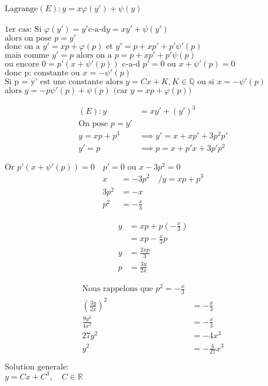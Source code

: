 $\text{Lagrange} (E): y = x \varphi(y') +\psi(y)$ \\ \\
$\text{1er cas: Si } \varphi(y') = y' \text{c-a-d} y = xy'+ \psi(y')$ \\
$\text{alors on pose } p = y'$ \\
$\text{donc on a } y' = xp + \varphi(p) \text{ et } y' = p + xp' + p'\psi'(p)$ \\
$\text{mais comme } y' = p \text{ alors on a }  p = p + xp' + p'\psi(p)$ \\
$\text{ou encore } 0 = p'(x + \psi'(p)) \text{ c-a-d } p' = 0 \text{ ou } x + \psi'(p) = 0$ \\
$\text{donc p: constante ou } x = - \psi'(p)$ \\
$\text{Si p = y' est une constante alors } y = Cx + K, K \in \mathbb{Q} \text{ ou si } x = -\psi'(p)$
$\text{alors } y = -p\psi'(p) + \psi(p) \text{ (car } y = xp + \varphi(p) \text{)}$

\begin{align*}
	(E): y &= xy' + (y')^{3} \\
	\text{On pose } p = y' \\
	y = xp + p^3 &\implies y' = x + xp' + 3p^2p' \\
	y' = p &\implies p = x + p'x + 3p'p^2
\end{align*}

$\text{Or } p'(x + \psi'(p)) = 0 \quad p' = 0 \text{ ou } x-3p^2 = 0$ \\
\begin{align*}
	x &= -3p^2 \quad /y = xp + p^3 \\
	3p^2 &= -x \\
	p^2 &= -\frac{x}{3}
\end{align*}

\begin{align*}
	y &= xp + p(-\frac{x}{3}) \\
	  &= xp - \frac{x}{3}p \\
	y &= \frac{2xp}{3} \\
	p &= \frac{3y}{2x}
\end{align*}

\begin{align*}
	\text{Nous rappelons que } p^2 = -\frac{x}{3} \\
	(\frac{3y}{2x})^2 &= -\frac{x}{3} \\
	\frac{9y^2}{4x^2} &= -\frac{x}{3} \\
	27y^2 &= -4x^3 \\
	y^2 &= -\frac{4}{27}x^3
\end{align*}

$\text{Solution generale: }$ \\
$y = Cx + C^3, \quad C \in \mathbb{R}$ \\ \\
